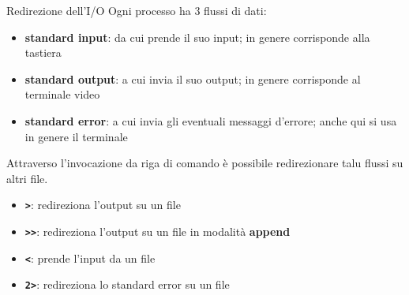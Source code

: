 \documentclass{beamer}
\begin{document}
    \begin{frame}{Redirezione dell'I/O}
        Ogni processo ha 3 flussi di dati:

        \begin{itemize}
            \item \textbf{standard input}: da cui prende il suo input; in genere corrisponde alla tastiera
            \item \textbf{standard output}: a cui invia il suo output; in genere corrisponde al terminale video
            \item \textbf{standard error}: a cui invia gli eventuali messaggi d'errore; anche qui si usa in genere il terminale
        \end{itemize}

        Attraverso l'invocazione da riga di comando è possibile
        redirezionare talu flussi su altri file.

        \begin{itemize}
            \item \texttt{\textbf{>}}: redireziona l'output su un file
            \item \texttt{\textbf{>{}>}}: redireziona l'output su un file in modalità \textbf{append}
            \item \texttt{\textbf{<}}: prende l'input da un file
            \item \texttt{\textbf{2>}}: redireziona lo standard error su un file
        \end{itemize}
    \end{frame}
\end{document}
